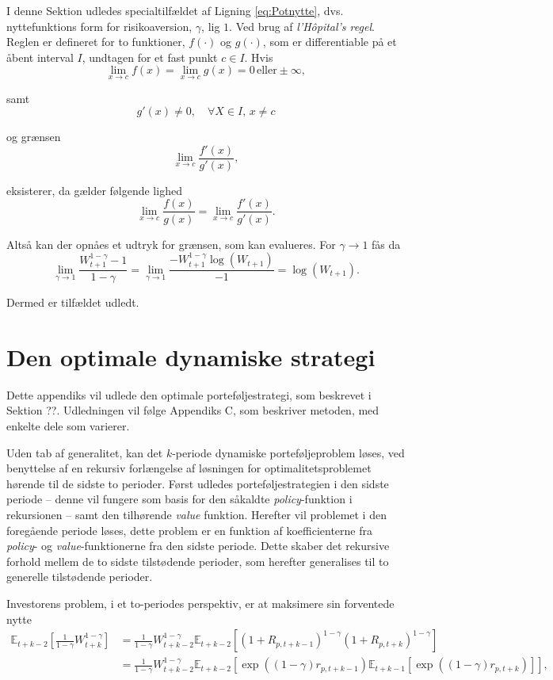 \documentclass[
  a4paper,
  oneside]{memoir}
\begin{document}
I denne Sektion udledes specialtilfældet af Ligning \eqref{eq:Potnytte}, dvs. nyttefunktions form for risikoaversion, \(\gamma\), lig \(1\). Ved brug af \emph{l'Hôpital's regel}. Reglen er defineret for to funktioner, \(f(\cdot)\) og \(g(\cdot)\), som er differentiable på et åbent interval \(I\), undtagen for et fast punkt \(c\in I\). Hvis
\[\lim_{x\to c} f(x)=\lim_{x\to c}g(x)=0\,\text{eller} \pm \infty,\]

samt
\[g'(x)\neq 0,\quad \forall X\in I,\,x\neq c\]

og grænsen
\[\lim_{x\to c} \frac{f'(x)}{g'(x)},\]

eksisterer, da gælder følgende lighed
\[\lim_{x\to c}\frac{f(x)}{g(x)}=\lim_{x\to c}\frac{f'(x)}{g'(x)}.\]

Altså kan der opnåes et udtryk for grænsen, som kan evalueres. For \(\gamma\rightarrow 1\) fås da
\[\lim_{\gamma\to 1}\frac{W_{t+1}^{1-\gamma}-1}{1-\gamma}=\lim_{\gamma\to 1}\frac{-W_{t+1}^{1-\gamma}\log\left(W_{t+1}\right)}{-1}=\log\left(W_{t+1}\right).\]

Dermed er tilfældet udledt.

\hypertarget{den-optimale-dynamiske-strategi}{%
\chapter{Den optimale dynamiske strategi}\label{den-optimale-dynamiske-strategi}}

Dette appendiks vil udlede den optimale porteføljestrategi, som beskrevet i Sektion ??. Udledningen vil følge \citep{JurVic2011} Appendiks C, som beskriver metoden, med enkelte dele som varierer.

Uden tab af generalitet, kan det \(k\)-periode dynamiske porteføljeproblem løses, ved benyttelse af en rekursiv forlængelse af løsningen for optimalitetsproblemet hørende til de sidste to perioder. Først udledes porteføljestrategien i den sidste periode -- denne vil fungere som basis for den såkaldte \emph{policy}-funktion i rekursionen -- samt den tilhørende \emph{value} funktion. Herefter vil problemet i den foregående periode løses, dette problem er en funktion af koefficienterne fra \emph{policy}- og \emph{value}-funktionerne fra den sidste periode. Dette skaber det rekursive forhold mellem de to sidste tilstødende perioder, som herefter generalises til to generelle tilstødende perioder.

Investorens problem, i et to-periodes perspektiv, er at maksimere sin forventede nytte
\begin{align*}
\mathbb{E}_{t+k-2}[\frac{1}{1-\gamma} W_{t+k}^{1-\gamma}]&=\frac{1}{1-\gamma} W_{t+k-2}^{1-\gamma} \mathbb{E}_{t+k-2}[(1+R_{p,t+k-1})^{1-\gamma}(1+R_{p,t+k})^{1-\gamma}]\\
&=\frac{1}{1-\gamma} W_{t+k-2}^{1-\gamma} \mathbb{E}_{t+k-2}[\exp((1-\gamma) r_{p,t+k-1}) \mathbb{E}_{t+k-1}[\exp((1-\gamma)r_{p,t+k})]],
\end{align*}
\end{document}
